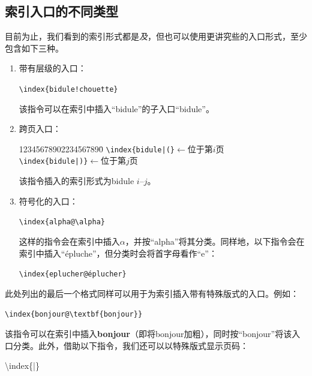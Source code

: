 \subsection{索引入口的不同类型}

目前为止，我们看到的索引形式都是\emph{及}，但也可以使用更讲究些的入口形式，至少包含如下三种。

\begin{enumerate}
    \item 带有层级的入口：
    
    \begin{dmd}
    \verb|\index{bidule!chouette}|
    \end{dmd}

    该指令可以在索引中插入“bidule”的子入口“bidule”。

    \item 跨页入口：
\begin{dmd}
\begin{tabbing}
12345678902234567890\=\kill
\verb+\index{bidule|(}+\>\textsf{$\leftarrow$位于第$i$页}\\
\verb+\index{bidule|)}+\>\textsf{$\leftarrow$位于第$j$页}
\end{tabbing}
\end{dmd}
    该指令插入的索引形式为bidule $i$--$j$。

    \item 符号化的入口：
    
    \begin{dmd}
    \verb|\index{alpha@\alpha}|
    \end{dmd}

    这样的指令会在索引中插入$\alpha$，并按“alpha”将其分类。同样地，以下指令会在索引中插入“épluche”，但分类时会将首字母看作“e”：

    \begin{dmd}
    \verb|\index{eplucher@éplucher}|
    \end{dmd}
\end{enumerate}

此处列出的最后一个格式同样可以用于为索引插入带有特殊版式的入口。例如：

\begin{dmd}
\verb|\index{bonjour@\textbf{bonjour}}|
\end{dmd}

该指令可以在索引中插入\textbf{bonjour}（即将bonjour加粗），同时按“bonjour”将该入口分类。此外，借助以下指令，我们还可以以特殊版式显示页码：

\begin{dmd}
\backslash index\{|\}
\end{dmd}

